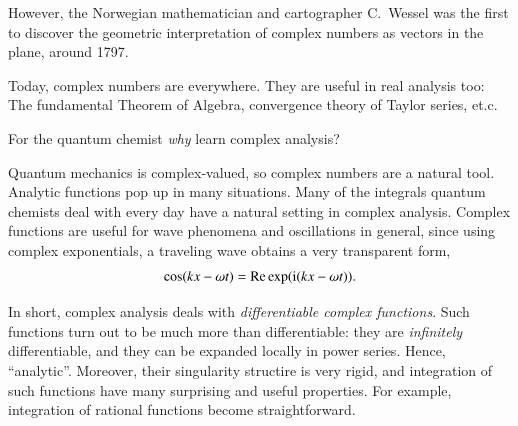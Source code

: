However, the Norwegian mathematician and cartographer C.~Wessel was the first to discover the geometric interpretation of complex numbers as vectors in the plane, around 1797.

Today, complex numbers are everywhere. They are useful in real analysis too: The fundamental Theorem of Algebra, convergence theory of Taylor series, et.c.

For the quantum chemist \emph{why} learn complex analysis?

Quantum mechanics is complex-valued, so complex numbers are a natural tool. Analytic functions pop up in many situations. Many of the integrals quantum chemists deal with every day have a natural setting in complex analysis. Complex functions are useful for wave phenomena and oscillations in general, since using complex exponentials, a traveling wave obtains a very transparent form,
\begin{equation}
    \cos(kx - \omega t) = \operatorname{Re} \exp(\mathrm{i}(kx-\omega t)). 
\end{equation} 


In short, complex analysis deals with \emph{differentiable complex functions}. Such functions turn out to be much more than differentiable: they are \emph{infinitely} differentiable, and they can be expanded locally in power series. Hence, ``analytic''. Moreover, their singularity structire is very rigid, and integration of such functions have many surprising and useful properties. For example, integration of rational functions become straightforward.






